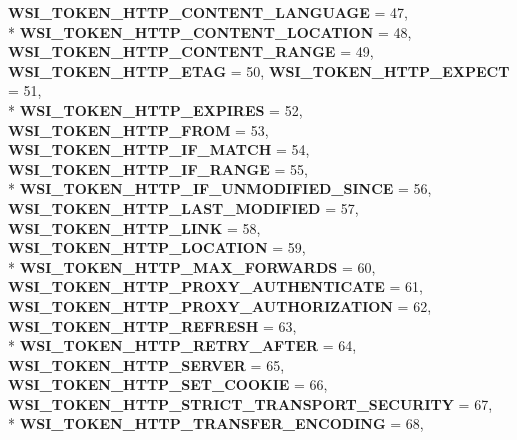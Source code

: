 \begin{DoxyCompactItemize}
{\bfseries W\+S\+I\+\_\+\+T\+O\+K\+E\+N\+\_\+\+H\+T\+T\+P\+\_\+\+C\+O\+N\+T\+E\+N\+T\+\_\+\+L\+A\+N\+G\+U\+A\+GE} = 47, 
\\*
{\bfseries W\+S\+I\+\_\+\+T\+O\+K\+E\+N\+\_\+\+H\+T\+T\+P\+\_\+\+C\+O\+N\+T\+E\+N\+T\+\_\+\+L\+O\+C\+A\+T\+I\+ON} = 48, 
{\bfseries W\+S\+I\+\_\+\+T\+O\+K\+E\+N\+\_\+\+H\+T\+T\+P\+\_\+\+C\+O\+N\+T\+E\+N\+T\+\_\+\+R\+A\+N\+GE} = 49, 
{\bfseries W\+S\+I\+\_\+\+T\+O\+K\+E\+N\+\_\+\+H\+T\+T\+P\+\_\+\+E\+T\+AG} = 50, 
{\bfseries W\+S\+I\+\_\+\+T\+O\+K\+E\+N\+\_\+\+H\+T\+T\+P\+\_\+\+E\+X\+P\+E\+CT} = 51, 
\\*
{\bfseries W\+S\+I\+\_\+\+T\+O\+K\+E\+N\+\_\+\+H\+T\+T\+P\+\_\+\+E\+X\+P\+I\+R\+ES} = 52, 
{\bfseries W\+S\+I\+\_\+\+T\+O\+K\+E\+N\+\_\+\+H\+T\+T\+P\+\_\+\+F\+R\+OM} = 53, 
{\bfseries W\+S\+I\+\_\+\+T\+O\+K\+E\+N\+\_\+\+H\+T\+T\+P\+\_\+\+I\+F\+\_\+\+M\+A\+T\+CH} = 54, 
{\bfseries W\+S\+I\+\_\+\+T\+O\+K\+E\+N\+\_\+\+H\+T\+T\+P\+\_\+\+I\+F\+\_\+\+R\+A\+N\+GE} = 55, 
\\*
{\bfseries W\+S\+I\+\_\+\+T\+O\+K\+E\+N\+\_\+\+H\+T\+T\+P\+\_\+\+I\+F\+\_\+\+U\+N\+M\+O\+D\+I\+F\+I\+E\+D\+\_\+\+S\+I\+N\+CE} = 56, 
{\bfseries W\+S\+I\+\_\+\+T\+O\+K\+E\+N\+\_\+\+H\+T\+T\+P\+\_\+\+L\+A\+S\+T\+\_\+\+M\+O\+D\+I\+F\+I\+ED} = 57, 
{\bfseries W\+S\+I\+\_\+\+T\+O\+K\+E\+N\+\_\+\+H\+T\+T\+P\+\_\+\+L\+I\+NK} = 58, 
{\bfseries W\+S\+I\+\_\+\+T\+O\+K\+E\+N\+\_\+\+H\+T\+T\+P\+\_\+\+L\+O\+C\+A\+T\+I\+ON} = 59, 
\\*
{\bfseries W\+S\+I\+\_\+\+T\+O\+K\+E\+N\+\_\+\+H\+T\+T\+P\+\_\+\+M\+A\+X\+\_\+\+F\+O\+R\+W\+A\+R\+DS} = 60, 
{\bfseries W\+S\+I\+\_\+\+T\+O\+K\+E\+N\+\_\+\+H\+T\+T\+P\+\_\+\+P\+R\+O\+X\+Y\+\_\+\+A\+U\+T\+H\+E\+N\+T\+I\+C\+A\+TE} = 61, 
{\bfseries W\+S\+I\+\_\+\+T\+O\+K\+E\+N\+\_\+\+H\+T\+T\+P\+\_\+\+P\+R\+O\+X\+Y\+\_\+\+A\+U\+T\+H\+O\+R\+I\+Z\+A\+T\+I\+ON} = 62, 
{\bfseries W\+S\+I\+\_\+\+T\+O\+K\+E\+N\+\_\+\+H\+T\+T\+P\+\_\+\+R\+E\+F\+R\+E\+SH} = 63, 
\\*
{\bfseries W\+S\+I\+\_\+\+T\+O\+K\+E\+N\+\_\+\+H\+T\+T\+P\+\_\+\+R\+E\+T\+R\+Y\+\_\+\+A\+F\+T\+ER} = 64, 
{\bfseries W\+S\+I\+\_\+\+T\+O\+K\+E\+N\+\_\+\+H\+T\+T\+P\+\_\+\+S\+E\+R\+V\+ER} = 65, 
{\bfseries W\+S\+I\+\_\+\+T\+O\+K\+E\+N\+\_\+\+H\+T\+T\+P\+\_\+\+S\+E\+T\+\_\+\+C\+O\+O\+K\+IE} = 66, 
{\bfseries W\+S\+I\+\_\+\+T\+O\+K\+E\+N\+\_\+\+H\+T\+T\+P\+\_\+\+S\+T\+R\+I\+C\+T\+\_\+\+T\+R\+A\+N\+S\+P\+O\+R\+T\+\_\+\+S\+E\+C\+U\+R\+I\+TY} = 67, 
\\*
{\bfseries W\+S\+I\+\_\+\+T\+O\+K\+E\+N\+\_\+\+H\+T\+T\+P\+\_\+\+T\+R\+A\+N\+S\+F\+E\+R\+\_\+\+E\+N\+C\+O\+D\+I\+NG} = 68, 

\end{DoxyCompactItemize}
